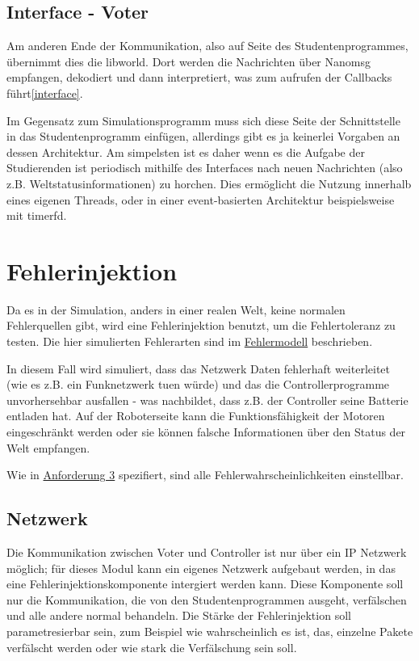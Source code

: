 \subsection{Interface - Voter}
Am anderen Ende der Kommunikation, also auf Seite des Studentenprogrammes, {\"{u}}bernimmt dies die libworld. Dort werden die
Nachrichten {\"{u}}ber Nanomsg empfangen, dekodiert und dann interpretiert, was zum aufrufen der Callbacks f{\"{u}}hrt\ref{interface}.

Im Gegensatz zum Simulationsprogramm muss sich diese Seite der Schnittstelle in das Studentenprogramm einf{\"{u}}gen, allerdings
gibt es ja keinerlei Vorgaben an dessen Architektur. Am simpelsten ist es daher wenn es die Aufgabe der Studierenden ist periodisch
mithilfe des Interfaces nach neuen Nachrichten (also z.B. Weltstatusinformationen) zu horchen. Dies erm{\"{o}}glicht die Nutzung
innerhalb eines eigenen Threads, oder in einer event-basierten Architektur beispielsweise mit timerfd.

\clearpage
\section{Fehlerinjektion}
Da es in der Simulation, anders in einer realen Welt, keine normalen Fehlerquellen gibt, wird eine
Fehlerinjektion benutzt, um die Fehlertoleranz zu testen. Die hier simulierten Fehlerarten 
sind im \hyperref[fm]{Fehlermodell} beschrieben.

In diesem Fall wird simuliert, dass das Netzwerk Daten fehlerhaft weiterleitet
(wie es z.B. ein Funknetzwerk tuen w{\"{u}}rde) und das die Controllerprogramme unvorhersehbar
ausfallen - was nachbildet, dass z.B. der Controller seine Batterie entladen hat. Auf der Roboterseite
kann die Funktionsf{\"{a}}higkeit der Motoren eingeschr{\"{a}}nkt werden oder sie k{\"{o}}nnen
falsche Informationen {\"{u}}ber den Status der Welt empfangen.

Wie in \hyperref[anforderung]{Anforderung 3} spezifiert, sind alle Fehlerwahrscheinlichkeiten einstellbar.

\subsection{Netzwerk}
Die Kommunikation zwischen Voter und Controller ist nur {\"{u}}ber ein IP Netzwerk m{\"{o}}glich;
f{\"{u}}r dieses Modul kann ein eigenes Netzwerk aufgebaut werden, in das eine Fehlerinjektionskomponente 
intergiert werden kann. Diese Komponente soll nur die Kommunikation, die von den Studentenprogrammen ausgeht, 
verf{\"{a}}lschen und alle andere normal behandeln. Die St{\"{a}}rke der Fehlerinjektion soll parametresierbar 
sein, zum Beispiel wie wahrscheinlich es ist, das, einzelne Pakete verf{\"{a}}lscht werden oder wie stark
die Verf{\"{a}}lschung sein soll.

